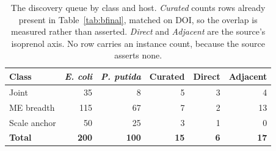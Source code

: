 \begingroup
\footnotesize
\begin{longtable}{@{}L{34mm} r r r r r@{}}
\caption[]{The discovery queue by class and host. \emph{Curated} counts rows already present in Table~\ref{tab:bfinal}, matched on DOI, so the overlap is measured rather than asserted. \emph{Direct} and \emph{Adjacent} are the source's isoprenol axis. No row carries an instance count, because the source asserts none.}
\label{tab:bqueue}\\
\toprule
\textbf{Class} & \textbf{\emph{E. coli}} & \textbf{\emph{P. putida}} & \textbf{Curated} & \textbf{Direct} & \textbf{Adjacent} \\
\midrule
\endfirsthead
\bottomrule
\endfoot
Joint & 35 & 8 & 5 & 3 & 4 \\
ME breadth & 115 & 67 & 7 & 2 & 13 \\
Scale anchor & 50 & 25 & 3 & 1 & 0 \\
\midrule
\textbf{Total} & \textbf{200} & \textbf{100} & \textbf{15} & \textbf{6} & \textbf{17} \\
\end{longtable}
\endgroup
